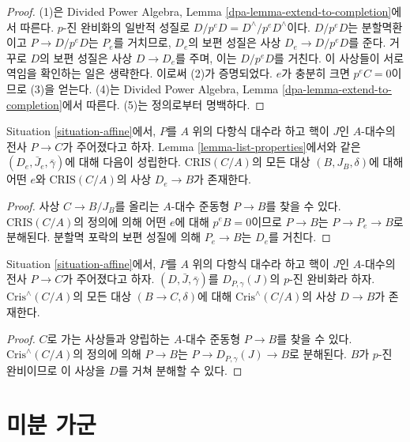 \begin{proof}
(1)은 Divided Power Algebra,
Lemma \ref{dpa-lemma-extend-to-completion}에서 따른다.
$p$-진 완비화의 일반적 성질로
$D/p^eD = D^\wedge/p^eD^\wedge$이다.
$D/p^eD$는 분할멱환이고 $P \to D/p^eD$는 $P_e$를 거치므로,
$D_e$의 보편 성질은 사상 $D_e \to D/p^eD$를 준다.
거꾸로 $D$의 보편 성질은 사상 $D \to D_e$를 주며, 이는
$D/p^eD$를 거친다. 이 사상들이 서로 역임을 확인하는 일은 생략한다.
이로써 (2)가 증명되었다. $e$가 충분히 크면 $p^eC = 0$이므로
(3)을 얻는다. (4)는 Divided Power Algebra,
Lemma \ref{dpa-lemma-extend-to-completion}에서 따른다.
(5)는 정의로부터 명백하다.
\end{proof}

\begin{lemma}
\label{lemma-set-generators}
Situation \ref{situation-affine}에서, $P$를 $A$ 위의 다항식 대수라 하고
핵이 $J$인 $A$-대수의 전사 $P \to C$가 주어졌다고 하자.
Lemma \ref{lemma-list-properties}에서와 같은
$(D_e, \bar J_e, \bar\gamma)$에 대해 다음이 성립한다.
$\text{CRIS}(C/A)$의 모든 대상 $(B, J_B, \delta)$에 대해 어떤 $e$와
$\text{CRIS}(C/A)$의 사상 $D_e \to B$가 존재한다.
\end{lemma}

\begin{proof}
사상 $C \to B/J_B$를 올리는 $A$-대수 준동형 $P \to B$를
찾을 수 있다. $\text{CRIS}(C/A)$의 정의에 의해 어떤 $e$에 대해
$p^eB = 0$이므로 $P \to B$는 $P \to P_e \to B$로 분해된다.
분할멱 포락의 보편 성질에 의해 $P_e \to B$는 $D_e$를 거친다.
\end{proof}

\begin{lemma}
\label{lemma-generator-completion}
Situation \ref{situation-affine}에서, $P$를 $A$ 위의 다항식 대수라 하고
핵이 $J$인 $A$-대수의 전사 $P \to C$가 주어졌다고 하자.
$(D, \bar J, \bar\gamma)$를 $D_{P, \gamma}(J)$의 $p$-진 완비화라 하자.
$\text{Cris}^\wedge(C/A)$의 모든 대상 $(B \to C, \delta)$에 대해
$\text{Cris}^\wedge(C/A)$의 사상 $D \to B$가 존재한다.
\end{lemma}

\begin{proof}
$C$로 가는 사상들과 양립하는 $A$-대수 준동형 $P \to B$를
찾을 수 있다. $\text{Cris}^\wedge(C/A)$의 정의에 의해
$P \to B$는 $P \to D_{P, \gamma}(J) \to B$로 분해된다.
$B$가 $p$-진 완비이므로 이 사상을 $D$를 거쳐 분해할 수 있다.
\end{proof}




\section{미분 가군}
\label{section-differentials}

